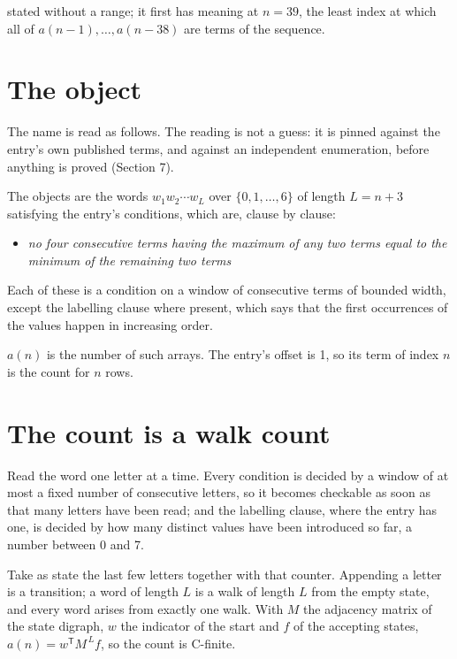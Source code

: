 \documentclass[11pt]{article}
\theoremstyle{definition}
\begin{document}
stated without a range; it first has meaning at $n = 39$, the least index at which all of $a(n-1),\dots,a(n-38)$ are terms of the sequence.

\section{The object}

The name is read as follows. The reading is not a guess: it is pinned against the entry's own published terms, and against an independent enumeration, before anything is proved (Section 7).

The objects are the words $w_1 w_2 \cdots w_L$ over $\{0,1,\dots,6\}$ of length $L = n + 3$ satisfying the entry's conditions, which are, clause by clause:

\begin{itemize}

\item {\itshape no four consecutive terms having the maximum of any two terms equal to the minimum of the remaining two terms}

\end{itemize}

Each of these is a condition on a window of consecutive terms of bounded width, except the labelling clause where present, which says that the first occurrences of the values happen in increasing order.

$a(n)$ is the number of such arrays. The entry's offset is 1, so its term of index $n$ is the count for $n$ rows.

\section{The count is a walk count}

Read the word one letter at a time. Every condition is decided by a window of at most a fixed number of consecutive letters, so it becomes checkable as soon as that many letters have been read; and the labelling clause, where the entry has one, is decided by how many distinct values have been introduced so far, a number between $0$ and 7.

Take as state the last few letters together with that counter. Appending a letter is a transition; a word of length $L$ is a walk of length $L$ from the empty state, and every word arises from exactly one walk. With $M$ the adjacency matrix of the state digraph, $w$ the indicator of the start and $f$ of the accepting states, $a(n) = w^{\mathsf T}M^{\,L}f$, so the count is C-finite.
\end{document}
